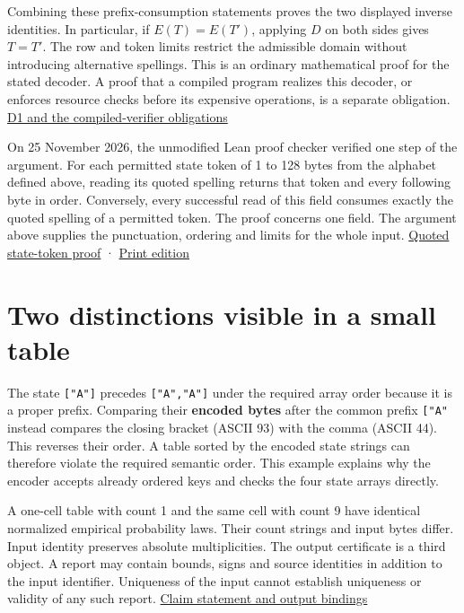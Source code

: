\documentclass[11pt,a4paper]{article}
\begin{document}
Combining these prefix-consumption statements proves the two displayed inverse identities. In particular, if \(E(T)=E(T')\), applying \(D\) on both sides gives \(T=T'\). The row and token limits restrict the admissible domain without introducing alternative spellings. This is an ordinary mathematical proof for the stated decoder. A proof that a compiled program realizes this decoder, or enforces resource checks before its expensive operations, is a separate obligation. \href{https://github.com/sepahead/pid-rs/blob/1479fc5e0ca15e5ef9c5521f8bc7aa36f2a98d20/claims/SX-CERTIFIED-AVERAGED-PID3-001/obligations.md}{D1 and the compiled-verifier obligations}

On 25 November 2026, the unmodified Lean proof checker verified one step of the argument. For each permitted state token of 1 to 128 bytes from the alphabet defined above, reading its quoted spelling returns that token and every following byte in order. Conversely, every successful read of this field consumes exactly the quoted spelling of a permitted token. The proof concerns one field. The argument above supplies the punctuation, ordering and limits for the whole input. \href{https://github.com/sepahead/pid-rs/blob/main/audit/research/categorical-state-token/README.md}{Quoted state-token proof} · \href{https://github.com/sepahead/pid-rs/blob/main/output/pdf/categorical-state-token.pdf}{Print edition}

\section{Two distinctions visible in a small table}\label{two-distinctions-visible-in-a-small-table}

The state \texttt{{[}"A"{]}} precedes \texttt{{[}"A","A"{]}} under the required array order because it is a proper prefix. Comparing their \textbf{encoded bytes} after the common prefix \texttt{{[}"A"} instead compares the closing bracket (ASCII 93) with the comma (ASCII 44). This reverses their order. A table sorted by the encoded state strings can therefore violate the required semantic order. This example explains why the encoder accepts already ordered keys and checks the four state arrays directly.

A one-cell table with count 1 and the same cell with count 9 have identical normalized empirical probability laws. Their count strings and input bytes differ. Input identity preserves absolute multiplicities. The output certificate is a third object. A report may contain bounds, signs and source identities in addition to the input identifier. Uniqueness of the input cannot establish uniqueness or validity of any such report. \href{https://github.com/sepahead/pid-rs/blob/1479fc5e0ca15e5ef9c5521f8bc7aa36f2a98d20/claims/SX-CERTIFIED-AVERAGED-PID3-001/claim-v1.md}{Claim statement and output bindings}
\end{document}

